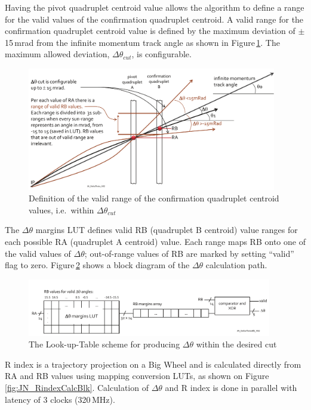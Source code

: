 Having the pivot quadruplet centroid value allows the algorithm to define a range for the valid values of the confirmation quadruplet centroid.
A valid range for the confirmation quadruplet centroid value is defined by the maximum deviation of $\pm$15\,mrad from the infinite momentum track angle
as shown in Figure\,\ref{fig:JN_DeltaTheta}.
The maximum allowed deviation, $\Delta\theta_{cut}$, is configurable.

\begin{figure}[h]
   \centering
   \includegraphics[width=0.97\textwidth]{figures/JN_DeltaTheta_V02.pdf}
   \caption{Definition of the valid range of the confirmation quadruplet centroid values, i.e.\ within $\Delta\theta_{cut}$}
   \label{fig:JN_DeltaTheta}
\end{figure}

The $\Delta\theta$ margins LUT defines valid RB (quadruplet B centroid) value ranges for each possible RA (quadruplet A centroid) value.
Each range maps RB onto one of the valid values of $\Delta\theta$; out-of-range values of RB are marked by setting ``valid'' flag to zero.
Figure\,\ref{fig:JN_DeltaThetaBlk} shows a block diagram of the $\Delta\theta$ calculation path.

\begin{figure}[h]
   \centering
   \includegraphics[width=0.95\textwidth]{figures/JN_DeltaThetaBlk_V02.pdf}
   \caption{The Look-up-Table scheme for producing $\Delta\theta$ within the desired cut}
   \label{fig:JN_DeltaThetaBlk}
\end{figure}


R index is a trajectory projection on a Big Wheel and is calculated directly from RA and RB values using mapping conversion LUTs,
as shown on Figure\,\ref{fig:JN_RindexCalcBlk}. Calculation of $\Delta\theta$ and R index is done in parallel with latency of 3 clocks (320\,MHz).



